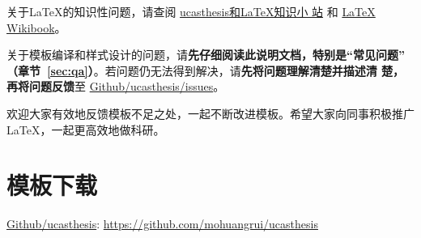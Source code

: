 关于\LaTeX{}的知识性问题，请查阅
\href{https://github.com/mohuangrui/ucasthesis/wiki}{ucasthesis和\LaTeX{}知识小
站} 和 \href{https://en.wikibooks.org/wiki/LaTeX}{\LaTeX{} Wikibook}。

关于模板编译和样式设计的问题，请\textbf{先仔细阅读此说明文档，特别是“常见问题”
（章节~\ref{sec:qa}）}。若问题仍无法得到解决，请\textbf{先将问题理解清楚并描述清
楚，再将问题反馈}至
\href{https://github.com/mohuangrui/ucasthesis/issues}{Github/ucasthesis/issues}。

欢迎大家有效地反馈模板不足之处，一起不断改进模板。希望大家向同事积极推广
\LaTeX{}，一起更高效地做科研。

\section{模板下载}

\begin{center}
    \href{https://github.com/mohuangrui/ucasthesis}{Github/ucasthesis}: \url{https://github.com/mohuangrui/ucasthesis}
\end{center}

